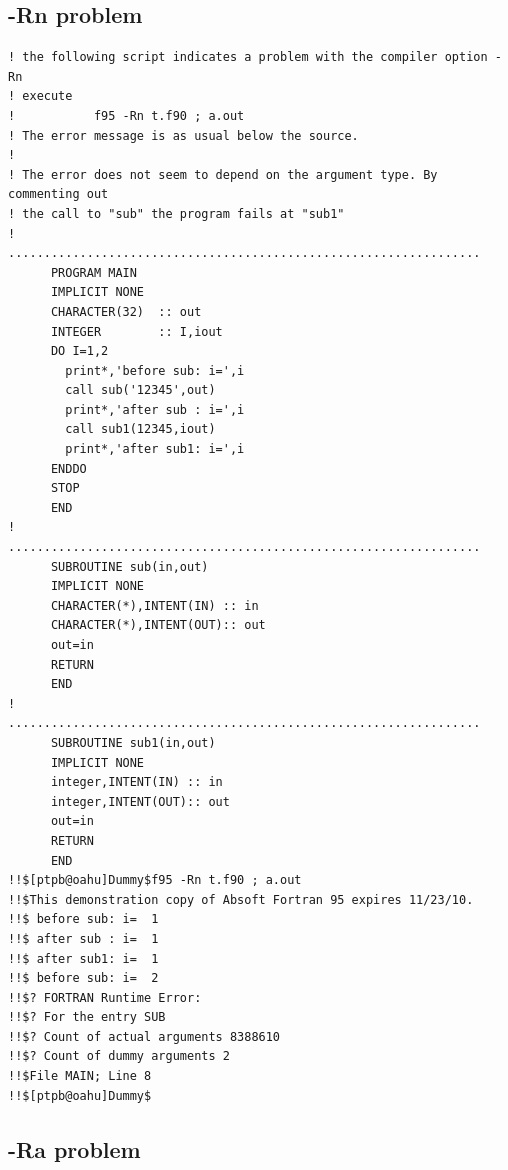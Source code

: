 \documentclass[a4paper,10pt]{report}
\begin{document}


\subsection{-Rn problem}
\begin{verbatim}
! the following script indicates a problem with the compiler option -Rn
! execute 
!           f95 -Rn t.f90 ; a.out
! The error message is as usual below the source.
! 
! The error does not seem to depend on the argument type. By commenting out
! the call to "sub" the program fails at "sub1"
!     ..................................................................
      PROGRAM MAIN
      IMPLICIT NONE
      CHARACTER(32)  :: out
      INTEGER        :: I,iout
      DO I=1,2
        print*,'before sub: i=',i
        call sub('12345',out)
        print*,'after sub : i=',i
        call sub1(12345,iout)
        print*,'after sub1: i=',i
      ENDDO
      STOP
      END
!     ..................................................................
      SUBROUTINE sub(in,out)
      IMPLICIT NONE
      CHARACTER(*),INTENT(IN) :: in
      CHARACTER(*),INTENT(OUT):: out
      out=in
      RETURN
      END
!     ..................................................................
      SUBROUTINE sub1(in,out)
      IMPLICIT NONE
      integer,INTENT(IN) :: in
      integer,INTENT(OUT):: out
      out=in
      RETURN
      END
!!$[ptpb@oahu]Dummy$f95 -Rn t.f90 ; a.out
!!$This demonstration copy of Absoft Fortran 95 expires 11/23/10.
!!$ before sub: i=  1
!!$ after sub : i=  1
!!$ after sub1: i=  1
!!$ before sub: i=  2
!!$? FORTRAN Runtime Error:
!!$? For the entry SUB
!!$? Count of actual arguments 8388610
!!$? Count of dummy arguments 2
!!$File MAIN; Line 8
!!$[ptpb@oahu]Dummy$
\end{verbatim}


\subsection{-Ra problem}
\end{document}
